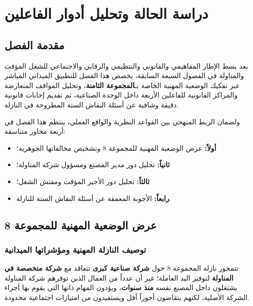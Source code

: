 
\chapter{دراسة الحالة وتحليل أدوار الفاعلين}
\label{chap:chapitre8}

\section*{مقدمة الفصل}

بعد بسط الإطار المفاهيمي والقانوني والتنظيمي والرقابي والاجتماعي للشغل المؤقت والمناولة في الفصول السبعة السابقة، يخصص هذا الفصل للتطبيق الميداني المباشر عبر تفكيك الوضعية المهنية الخاصة بـ\textbf{المجموعة الثامنة}، وتحليل المواقف المتعارضة والمراكز القانونية للفاعلين الأربعة داخل الوحدة الصناعية، ثم تقديم إجابات قانونية دقيقة وشافية عن أسئلة النقاش الستة المطروحة في النازلة.

ولضمان الربط المنهجي بين القواعد النظرية والواقع العملي، ينتظم هذا الفصل في أربعة محاور متناسقة:
\begin{itemize}[leftmargin=*, itemsep=4pt]
    \item \textbf{أولاً:} عرض الوضعية المهنية للمجموعة \textenglish{8} وتشخيص مخالفاتها الجوهرية؛
    \item \textbf{ثانياً:} تحليل دور مدير المصنع ومسؤول شركة المناولة؛
    \item \textbf{ثالثاً:} تحليل دور الأجير المؤقت ومفتش الشغل؛
    \item \textbf{رابعاً:} الأجوبة المعمقة عن أسئلة النقاش الستة للنازلة.
\end{itemize}

\section{عرض الوضعية المهنية للمجموعة 8}

\subsection{توصيف النازلة المهنية ومؤشراتها الميدانية}
تتمحور نازلة المجموعة \textenglish{8} حول \textbf{شركة صناعية كبرى} تتعاقد مع \textbf{شركة متخصصة في المناولة} لتوفير اليد العاملة؛ غير أن عدداً من العمال الذين توفرهم شركة المناولة يشتغلون داخل المصنع نفسه \textbf{منذ سنوات}، ويؤدون المهام ذاتها التي يقوم بها أجراء الشركة الأصلية، لكنهم يتقاضون أجوراً أقل ويستفيدون من امتيازات اجتماعية محدودة.

